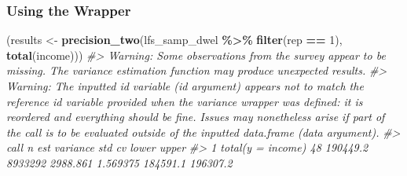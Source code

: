 \documentclass[
]{article}
\newenvironment{Shaded}{\begin{snugshade}}{\end{snugshade}}
\newcommand{\AttributeTok}[1]{\textcolor[rgb]{0.13,0.29,0.53}{#1}}
\newcommand{\CommentTok}[1]{\textcolor[rgb]{0.56,0.35,0.01}{\textit{#1}}}
\newcommand{\DecValTok}[1]{\textcolor[rgb]{0.00,0.00,0.81}{#1}}
\newcommand{\FunctionTok}[1]{\textcolor[rgb]{0.13,0.29,0.53}{\textbf{#1}}}
\newcommand{\NormalTok}[1]{#1}
\newcommand{\OtherTok}[1]{\textcolor[rgb]{0.56,0.35,0.01}{#1}}
\newcommand{\SpecialCharTok}[1]{\textcolor[rgb]{0.81,0.36,0.00}{\textbf{#1}}}
\newcommand{\StringTok}[1]{\textcolor[rgb]{0.31,0.60,0.02}{#1}}
\begin{document}
\begin{Shaded}
\end{Shaded}

\subsubsection{Using the Wrapper}\label{using-the-wrapper-3}

\begin{Shaded}
\begin{Highlighting}[]
\NormalTok{(results }\OtherTok{\textless{}{-}} \FunctionTok{precision\_two}\NormalTok{(lfs\_samp\_dwel }\SpecialCharTok{\%\textgreater{}\%} \FunctionTok{filter}\NormalTok{(rep }\SpecialCharTok{==} \DecValTok{1}\NormalTok{), }\FunctionTok{total}\NormalTok{(income)))}
\CommentTok{\#\textgreater{} Warning: Some observations from the survey appear to be missing. The variance estimation function may produce unexpected results.}
\CommentTok{\#\textgreater{} Warning: The inputted id variable (id argument) appears not to match the reference id variable provided when the variance wrapper was defined: it is reordered and everything should be fine. Issues may nonetheless arise if part of the call is to be evaluated outside of the inputted data.frame (data argument).}
\CommentTok{\#\textgreater{}                call  n      est variance      std       cv    lower    upper}
\CommentTok{\#\textgreater{} 1 total(y = income) 48 190449.2  8933292 2988.861 1.569375 184591.1 196307.2}
\end{Highlighting}
\end{Shaded}
\end{document}
